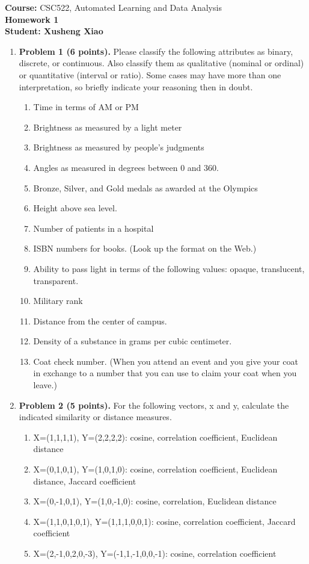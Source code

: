 \documentclass{article}%
\begin{document}
\begin{flushleft}
\textbf{Course:} CSC522, Automated Learning and Data Analysis\\
\textbf{Homework 1}\\
\textbf{Student: Xusheng Xiao}
\end{flushleft}

\noindent{\hrulefill}

\bigskip

\begin{enumerate}
	\item \textbf{Problem 1 (6 points).} Please classify the following attributes as binary, discrete, or continuous. Also classify them as qualitative (nominal or ordinal) or quantitative (interval or ratio). Some cases may have more than one interpretation, so briefly indicate your reasoning then in doubt.	
	\begin{enumerate}
		\item Time in terms of AM or PM
		\item Brightness as measured by a light meter
		\item Brightness as measured by people’s judgments
		\item Angles as measured in degrees between 0 and 360.
		\item Bronze, Silver, and Gold medals as awarded at the Olympics
		\item Height above sea level.
		\item Number of patients in a hospital
		\item ISBN numbers for books. (Look up the format on the Web.)
		\item Ability to pass light in terms of the following values: opaque, translucent, transparent.
		\item Military rank
		\item Distance from the center of campus.
		\item Density of a substance in grams per cubic centimeter.
		\item Coat check number. (When you attend an event and you give your coat in exchange to a number that you can use to claim your coat when you leave.)
	\end{enumerate}
  
 \item \textbf{Problem 2 (5 points).} For the following vectors, x and y, calculate the indicated similarity or distance measures.
 \begin{enumerate}
		\item X=(1,1,1,1), Y=(2,2,2,2): cosine, correlation coefficient, Euclidean distance
		\item X=(0,1,0,1), Y=(1,0,1,0): cosine, correlation coefficient, Euclidean distance, Jaccard coefficient
		\item X=(0,-1,0,1), Y=(1,0,-1,0): cosine, correlation, Euclidean distance
		\item X=(1,1,0,1,0,1), Y=(1,1,1,0,0,1): cosine, correlation coefficient, Jaccard coefficient
		\item X=(2,-1,0,2,0,-3), Y=(-1,1,-1,0,0,-1): cosine, correlation coefficient
 \end{enumerate}
 

\end{enumerate}
\end{document}
